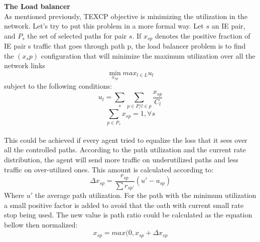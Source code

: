 {\bf The Load balancer}
\\ As mentioned previously, TEXCP objective is minimizing the utilization in the network. Let's try to put this problem in a more formal way. Let $s$ an IE pair, and $P_s$ the set of selected paths for pair $s$. If $x_{sp}$ denotes the positive fraction of IE pair s traffic that goes through path p, the load balancer problem is to find the $(x_sp)$ configuration that will minimize the maximum utilization over all the network links 
\begin{equation}
\min_{x_{sp}} max_{l \in L} u_{l}
\end{equation}
subject to the following conditions:
\begin{equation}
u_l = \sum_{s} \sum_{p \in P / l \in p} \frac {x_{sp} }{C_l}
\end{equation}
\begin{equation}
\sum_{p \in P_{s}} x_{sp} = 1,  \forall s
\end{equation}
\\ This could be achieved if every agent tried to equalize the loss that it sees over all the controlled paths. According to the path utilization and the current rate distribution, the agent will send more traffic on underutilized paths and less traffic on over-utilized ones. This amount is calculated according to:
\begin{equation}
\Delta x_{sp} = \frac{r_{sp}} {\sum r_{sp'}}  (u' - u_{sp}) 
\end{equation}
Where $u'$ the average path utilization. For the path with the minimum utilization a small positive factor is added to avoid that the oath with current small rate stop being used. The new value is path ratio could be calculated as the equation bellow then normalized:
\begin{equation}
x_{sp} = max(0, x_{sp} + \Delta x_{sp}
\end{equation}

